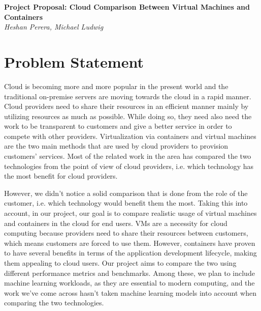 \documentclass[11pt]{article}
\begin{document}
\renewcommand{\headrulewidth}{0pt} 
\renewcommand{\footrulewidth}{0pt} 
\pagestyle{fancy}
\cfoot{}
\lhead{}
\rhead{}
\lfoot{\itshape\textcolor{gray}{CS525T Cloud Computing Paper Review}}

\begin{center}
{\LARGE \bf Project Proposal: Cloud Comparison Between Virtual Machines and Containers} \\
{\normalsize \emph{Heshan Perera, Michael Ludwig}}\\

\end{center}

\section{Problem Statement}


Cloud is becoming more and more popular in the present world and the traditional on-premise servers are moving towards the cloud in a rapid manner. Cloud providers need to share their resources in an efficient manner mainly by utilizing resources as much as possible. While doing so, they need also need the work to be transparent to customers and give a better service in order to compete with other providers. Virtualization via containers and virtual machines are the two main methods that are used by cloud providers to provision customers' services. Most of the related work in the area has compared the two technologies from the point of view of cloud providers, i.e. which technology has the most benefit for cloud providers.

However, we didn't notice a solid comparison that is done from the role of the customer, i.e. which technology would benefit them the most. Taking this into account, in our project, our goal is to compare realistic usage of virtual machines and containers in the cloud for end users. VMs are a necessity for cloud computing because providers need to share their resources between customers, which means customers are forced to use them. However, containers have proven to have several benefits in terms of the application development lifecycle, making them appealing to cloud users. Our project aims to compare the two using different performance metrics and benchmarks. Among these, we plan to include machine learning workloads, as they are essential to modern computing, and the work we've come across hasn't taken machine learning models into account when comparing the two technologies.
\end{document}
